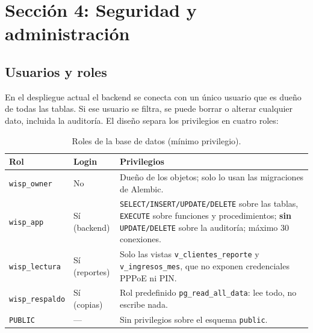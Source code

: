 

\section{Sección 4: Seguridad y administración}
\label{sec:ce02-seguridad-bd}

\subsection{Usuarios y roles}
\label{sec:ce02-roles}

En el despliegue actual el backend se conecta con un único usuario que es dueño de
todas las tablas. Si ese usuario se filtra, se puede borrar o alterar cualquier dato,
incluida la auditoría. El diseño separa los privilegios en cuatro roles:

\begin{table}[htbp]
\centering
\caption{Roles de la base de datos (mínimo privilegio).}
\label{tab:ce02-roles-bd}
\small
\begin{tabularx}{\textwidth}{L{2.6cm}L{1.4cm}X}
\toprule
\textbf{Rol} & \textbf{Login} & \textbf{Privilegios} \\
\midrule
\texttt{wisp\_owner} & No & Dueño de los objetos; solo lo usan las migraciones de Alembic. \\
\texttt{wisp\_app} & Sí (backend) & \texttt{SELECT/INSERT/UPDATE/DELETE} sobre las tablas, \texttt{EXECUTE} sobre funciones y procedimientos; \textbf{sin} \texttt{UPDATE/DELETE} sobre la auditoría; máximo 30 conexiones. \\
\texttt{wisp\_lectura} & Sí (reportes) & Solo las vistas \texttt{v\_clientes\_reporte} y \texttt{v\_ingresos\_mes}, que no exponen credenciales PPPoE ni PIN. \\
\texttt{wisp\_respaldo} & Sí (copias) & Rol predefinido \texttt{pg\_read\_all\_data}: lee todo, no escribe nada. \\
\texttt{PUBLIC} & --- & Sin privilegios sobre el esquema \texttt{public}. \\
\bottomrule
\end{tabularx}
\end{table}



